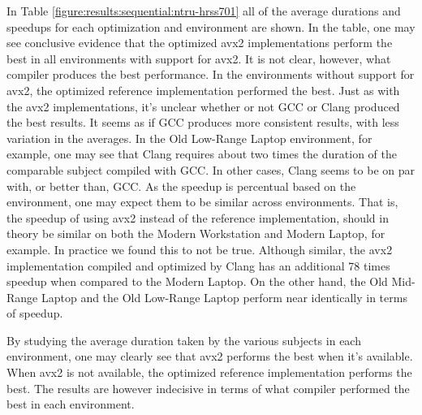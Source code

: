 In Table \ref{figure:results:sequential:ntru-hrss701} all of the average durations and speedups for each optimization and environment are shown. In the table, one may see conclusive evidence that the optimized \gls{avx2} implementations perform the best in all environments with support for \gls{avx2}. It is not clear, however, what compiler produces the best performance. In the environments without support for \gls{avx2}, the optimized reference implementation performed the best. Just as with the \gls{avx2} implementations, it's unclear whether or not GCC or Clang produced the best results. It seems as if GCC produces more consistent results, with less variation in the averages. In the Old Low-Range Laptop environment, for example, one may see that Clang requires about two times the duration of the comparable subject compiled with GCC. In other cases, Clang seems to be on par with, or better than, GCC. As the speedup is percentual based on the environment, one may expect them to be similar across environments. That is, the speedup of using \gls{avx2} instead of the reference implementation, should in theory be similar on both the Modern Workstation and Modern Laptop, for example. In practice we found this to not be true. Although similar, the \gls{avx2} implementation compiled and optimized by Clang has an additional 78 times speedup when compared to the Modern Laptop. On the other hand, the Old Mid-Range Laptop and the Old Low-Range Laptop perform near identically in terms of speedup.



By studying the average duration taken by the various subjects in each environment, one may clearly see that \gls{avx2} performs the best when it's available. When \gls{avx2} is not available, the optimized reference implementation performs the best. The results are however indecisive in terms of what compiler performed the best in each environment.

